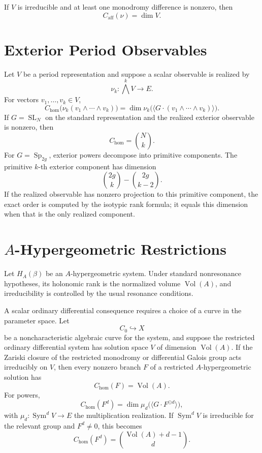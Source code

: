 \documentclass[11pt]{article}
\DeclareMathOperator{\Sym}{Sym}
\begin{document}
If \(V\) is irreducible and at least one monodromy difference is nonzero, then
\[
C_{\mathrm{aff}}(\nu)=\dim V.
\]

\section{Exterior Period Observables}

Let \(V\) be a period representation and suppose a scalar observable is realized by
\[
\nu_k:\bigwedge^k V\to E.
\]
For vectors \(v_1,\ldots,v_k\in V\),
\[
C_{\mathrm{hom}}\bigl(\nu_k(v_1\wedge\cdots\wedge v_k)\bigr)
=
\dim
\nu_k\bigl(\langle G\cdot(v_1\wedge\cdots\wedge v_k)\rangle\bigr).
\]
If \(G=\operatorname{SL}_N\) on the standard representation and the realized exterior observable is nonzero, then
\[
C_{\mathrm{hom}}=\binom Nk.
\]
For \(G=\operatorname{Sp}_{2g}\), exterior powers decompose into primitive components. The primitive \(k\)-th exterior component has dimension
\[
\binom{2g}{k}-\binom{2g}{k-2}.
\]
If the realized observable has nonzero projection to this primitive component, the exact order is computed by the isotypic rank formula; it equals this dimension when that is the only realized component.

\section{\texorpdfstring{\(A\)}{A}-Hypergeometric Restrictions}

Let \(H_A(\beta)\) be an \(A\)-hypergeometric system. Under standard nonresonance hypotheses, its holonomic rank is the normalized volume \(\operatorname{Vol}(A)\), and irreducibility is controlled by the usual resonance conditions.

A scalar ordinary differential consequence requires a choice of a curve in the parameter space. Let
\[
C_0\hookrightarrow X
\]
be a noncharacteristic algebraic curve for the system, and suppose the restricted ordinary differential system has solution space \(V\) of dimension \(\operatorname{Vol}(A)\). If the Zariski closure of the restricted monodromy or differential Galois group acts irreducibly on \(V\), then every nonzero branch \(F\) of a restricted \(A\)-hypergeometric solution has
\[
C_{\mathrm{hom}}(F)=\operatorname{Vol}(A).
\]
For powers,
\[
C_{\mathrm{hom}}(F^d)
=
\dim
\mu_d\bigl(\langle G\cdot F^{\odot d}\rangle\bigr),
\]
with \(\mu_d:\Sym^d V\to E\) the multiplication realization. If \(\Sym^d V\) is irreducible for the relevant group and \(F^d\ne0\), this becomes
\[
C_{\mathrm{hom}}(F^d)=\binom{\operatorname{Vol}(A)+d-1}{d}.
\]
\end{document}
